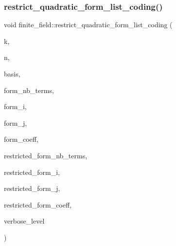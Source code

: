 \mbox{\label{classfinite__field_ac2c261998fe455590626d2cc5e215844}} 
\subsubsection{\texorpdfstring{restrict\+\_\+quadratic\+\_\+form\+\_\+list\+\_\+coding()}{restrict\_quadratic\_form\_list\_coding()}}
{\footnotesize\ttfamily void finite\+\_\+field\+::restrict\+\_\+quadratic\+\_\+form\+\_\+list\+\_\+coding (\begin{DoxyParamCaption}\item[{\mbox{\hyperlink{galois_8h_a09fddde158a3a20bd2dcadb609de11dc}{I\+NT}}}]{k,  }\item[{\mbox{\hyperlink{galois_8h_a09fddde158a3a20bd2dcadb609de11dc}{I\+NT}}}]{n,  }\item[{\mbox{\hyperlink{galois_8h_a09fddde158a3a20bd2dcadb609de11dc}{I\+NT}} $\ast$}]{basis,  }\item[{\mbox{\hyperlink{galois_8h_a09fddde158a3a20bd2dcadb609de11dc}{I\+NT}}}]{form\+\_\+nb\+\_\+terms,  }\item[{\mbox{\hyperlink{galois_8h_a09fddde158a3a20bd2dcadb609de11dc}{I\+NT}} $\ast$}]{form\+\_\+i,  }\item[{\mbox{\hyperlink{galois_8h_a09fddde158a3a20bd2dcadb609de11dc}{I\+NT}} $\ast$}]{form\+\_\+j,  }\item[{\mbox{\hyperlink{galois_8h_a09fddde158a3a20bd2dcadb609de11dc}{I\+NT}} $\ast$}]{form\+\_\+coeff,  }\item[{\mbox{\hyperlink{galois_8h_a09fddde158a3a20bd2dcadb609de11dc}{I\+NT}} \&}]{restricted\+\_\+form\+\_\+nb\+\_\+terms,  }\item[{\mbox{\hyperlink{galois_8h_a09fddde158a3a20bd2dcadb609de11dc}{I\+NT}} $\ast$\&}]{restricted\+\_\+form\+\_\+i,  }\item[{\mbox{\hyperlink{galois_8h_a09fddde158a3a20bd2dcadb609de11dc}{I\+NT}} $\ast$\&}]{restricted\+\_\+form\+\_\+j,  }\item[{\mbox{\hyperlink{galois_8h_a09fddde158a3a20bd2dcadb609de11dc}{I\+NT}} $\ast$\&}]{restricted\+\_\+form\+\_\+coeff,  }\item[{\mbox{\hyperlink{galois_8h_a09fddde158a3a20bd2dcadb609de11dc}{I\+NT}}}]{verbose\+\_\+level }\end{DoxyParamCaption})}

